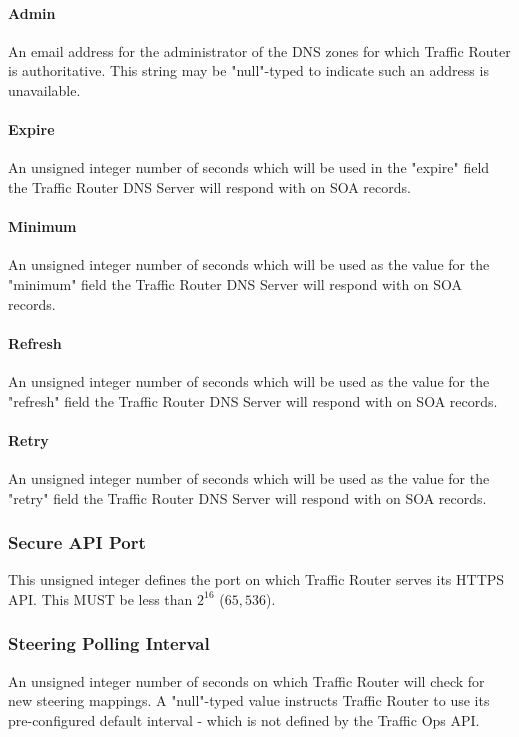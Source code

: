 \paragraph{Admin}
An email address for the administrator of the DNS zones for which Traffic Router
is authoritative. This string may be "null"-typed to indicate such an address is
unavailable.

\paragraph{Expire}
An unsigned integer number of seconds which will be used in the "expire" field
the Traffic Router DNS Server will respond with on SOA records.

\paragraph{Minimum}
An unsigned integer number of seconds which will be used as the value for the
"minimum" field the Traffic Router DNS Server will respond with on SOA records.

\paragraph{Refresh}
An unsigned integer number of seconds which will be used as the value for the
"refresh" field the Traffic Router DNS Server will respond with on SOA records.

\paragraph{Retry}
An unsigned integer number of seconds which will be used as the value for the
"retry" field the Traffic Router DNS Server will respond with on SOA records.

\subsubsection{Secure API Port}
This unsigned integer defines the port on which Traffic Router serves its HTTPS
API. This MUST be less than $2^{16}$ ($65,536$).

\subsubsection{Steering Polling Interval}
An unsigned integer number of seconds on which Traffic Router will check for new
steering mappings. A "null"-typed value instructs Traffic Router to use its
pre-configured default interval - which is not defined by the Traffic Ops API.

